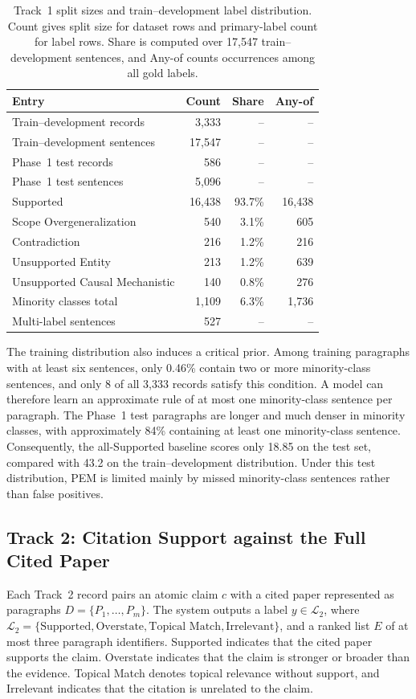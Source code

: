 \documentclass[runningheads]{llncs}
\newcommand{\pem}{PEM}
\newcommand{\lab}[1]{\textsf{\small #1}}
\begin{document}
\begin{table}[ht]
\centering
\caption{Track~1 split sizes and train--development label distribution. Count gives split size for dataset rows and primary-label count for label rows. Share is computed over 17,547 train--development sentences, and Any-of counts occurrences among all gold labels.}
\label{tab:t1-labels}
\small
\begin{tabular}{lrrr}
\toprule
Entry & Count & Share & Any-of\\
\midrule
Train--development records & 3,333 & -- & --\\
Train--development sentences & 17,547 & -- & --\\
Phase~1 test records & 586 & -- & --\\
Phase~1 test sentences & 5,096 & -- & --\\
\midrule
\lab{Supported} & 16,438 & 93.7\% & 16,438\\
\lab{Scope Overgeneralization} & 540 & 3.1\% & 605\\
\lab{Contradiction} & 216 & 1.2\% & 216\\
\lab{Unsupported Entity} & 213 & 1.2\% & 639\\
\lab{Unsupported Causal Mechanistic} & 140 & 0.8\% & 276\\
Minority classes total & 1,109 & 6.3\% & 1,736\\
Multi-label sentences & 527 & -- & --\\
\bottomrule
\end{tabular}
\end{table}

The training distribution also induces a critical prior. Among training paragraphs with at least six sentences, only 0.46\% contain two or more minority-class sentences, and only 8 of all 3,333 records satisfy this condition. A model can therefore learn an approximate rule of at most one minority-class sentence per paragraph. The Phase~1 test paragraphs are longer and much denser in minority classes, with approximately 84\% containing at least one minority-class sentence. Consequently, the all-\lab{Supported} baseline scores only 18.85 on the test set, compared with 43.2 on the train--development distribution. Under this test distribution, \pem{} is limited mainly by missed minority-class sentences rather than false positives.

\FloatBarrier

\subsection{Track 2: Citation Support against the Full Cited Paper}
Each Track~2 record pairs an atomic claim $c$ with a cited paper represented as paragraphs $D=\{P_1,\ldots,P_m\}$. The system outputs a label $y\in\mathcal{L}_2$, where $\mathcal{L}_2=\{\text{Supported},\text{Overstate},\text{Topical Match},\text{Irrelevant}\}$, and a ranked list $E$ of at most three paragraph identifiers. \lab{Supported} indicates that the cited paper supports the claim. \lab{Overstate} indicates that the claim is stronger or broader than the evidence. \lab{Topical Match} denotes topical relevance without support, and \lab{Irrelevant} indicates that the citation is unrelated to the claim.
\end{document}
